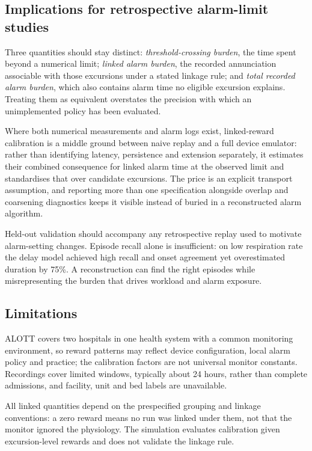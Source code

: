 \documentclass[11pt,letterpaper]{article}
\begin{document}
\subsection{Implications for retrospective alarm-limit studies}

Three quantities should stay distinct: \emph{threshold-crossing burden}, the time spent beyond a numerical limit; \emph{linked alarm burden}, the recorded annunciation associable with those excursions under a stated linkage rule; and \emph{total recorded alarm burden}, which also contains alarm time no eligible excursion explains. Treating them as equivalent overstates the precision with which an unimplemented policy has been evaluated.

Where both numerical measurements and alarm logs exist, linked-reward calibration is a middle ground between naive replay and a full device emulator: rather than identifying latency, persistence and extension separately, it estimates their combined consequence for linked alarm time at the observed limit and standardises that over candidate excursions. The price is an explicit transport assumption, and reporting more than one specification alongside overlap and coarsening diagnostics keeps it visible instead of buried in a reconstructed alarm algorithm.

Held-out validation should accompany any retrospective replay used to motivate alarm-setting changes. Episode recall alone is insufficient: on low respiration rate the delay model achieved high recall and onset agreement yet overestimated duration by 75\%. A reconstruction can find the right episodes while misrepresenting the burden that drives workload and alarm exposure.

\subsection{Limitations}

ALOTT covers two hospitals in one health system with a common monitoring environment, so reward patterns may reflect device configuration, local alarm policy and practice; the calibration factors are not universal monitor constants. Recordings cover limited windows, typically about 24 hours, rather than complete admissions, and facility, unit and bed labels are unavailable.

All linked quantities depend on the prespecified grouping and linkage conventions: a zero reward means no run was linked under them, not that the monitor ignored the physiology. The simulation evaluates calibration given excursion-level rewards and does not validate the linkage rule.
\end{document}
